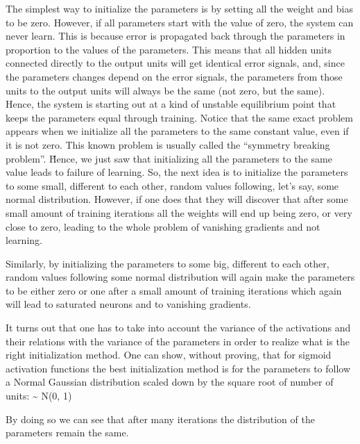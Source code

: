 The simplest way to initialize the parameters is by setting all the weight and bias to be zero. However, if all 
parameters start with the value of zero, the system can never learn. This is because error is propagated back through
the parameters in proportion to the values of the parameters. This means that all hidden units connected directly to 
the output units will get identical error signals, and, since the parameters changes depend on the error signals, the
parameters from those units to the output units will always be the same (not zero, but the same). Hence, the system is
starting out at a kind of unstable equilibrium point that keeps the parameters equal through training. Notice that 
the same exact problem appears when we initialize all the parameters to the same constant value, even if it is not 
zero. This known problem is usually called the ``symmetry breaking problem''. \v

Hence, we just saw that initializing all the parameters to the same value leads to failure of learning. So, the next 
idea is to initialize the parameters to some small, different to each other, random values following, let's say, some
normal distribution. However, if one does that they will discover that after some small amount of training iterations
all the weights will end up being zero, or very close to zero, leading to the whole problem of vanishing gradients 
and not learning.


Similarly, by initializing the parameters to some big, different to each other, random values following some normal 
distribution will again make the parameters to be either zero or one after a small amount of training iterations 
which again will lead to saturated neurons and to vanishing gradients.


It turns out that one has to take into account the variance of the activations and their relations with the variance 
of the parameters in order to realize what is the right initialization method. One can show, without proving, that 
for sigmoid activation functions the best initialization method is for the parameters to follow a Normal Gaussian 
distribution scaled down by the square root of number of units:
\bse
\theta \sim {} N(0, 1)
\ese

By doing so we can see that after many iterations the distribution of the parameters remain the same.



